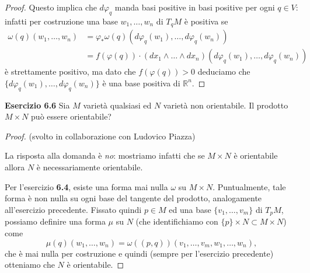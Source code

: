 \documentclass[a4paper]{article}
\newcommand{\R}{\mathbb{R}}
\theoremstyle{definition}
\theoremstyle{definition}
\theoremstyle{remark}
\theoremstyle{definition}
\begin{document}
\begin{proof}
    Questo implica che $d\varphi_q$ manda basi positive in basi positive per ogni $q\in V$: infatti per costruzione una base $w_1,\ldots,w_n$ di $T_qM$ è positiva se
    \begin{align*}
        \omega (q)(w_1,\ldots,w_n) &= \varphi_*\omega(q)(d\varphi_q(w_1),\ldots,d\varphi_q(w_n)) \\
        &= f(\varphi(q))\cdot (dx_1\wedge\ldots\wedge dx_n)(d\varphi_q(w_1),\ldots,d\varphi_q(w_n))
    \end{align*}
    è strettamente positivo, ma dato che $f(\varphi(q))>0$ deduciamo che $\{d\varphi_q(w_1),\ldots,d\varphi_q(w_n)\}$ è una base positiva di $\R^n$.
\end{proof}

\textbf{Esercizio 6.6}
Sia $M$ varietà qualsiasi ed $N$ varietà non orientabile. Il prodotto $M\times N$ può essere orientabile?

\begin{proof} (svolto in collaborazione con Ludovico Piazza)

    La risposta alla domanda è \textit{no}: mostriamo infatti che se $M\times N$ è orientabile allora $N$ è necessariamente orientabile.

    Per l'esercizio \textbf{6.4}, esiste una forma mai nulla $\omega$ su $M\times N$. Puntualmente, tale forma è non nulla su ogni base del tangente del prodotto, analogamente all'esercizio
    precedente. Fissato quindi $p\in M$ ed una base $\{v_1,\ldots,v_m\}$ di $T_pM$, possiamo definire una forma $\mu$ su $N$ (che identifichiamo con $\{p\}\times N  \subset M\times N$)
    come
    \[
        \mu(q)(w_1,\ldots,w_n) = \omega((p,q))(v_1,\ldots,v_m,w_1,\ldots,w_n),
    \]
    che è mai nulla per costruzione e quindi (sempre per l'esercizio precedente) otteniamo che $N$ è orientabile.
\end{proof}
\end{document}

